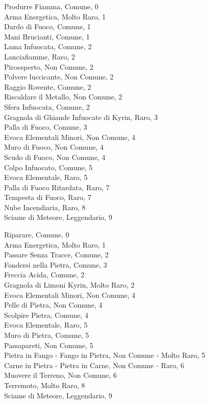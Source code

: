 \begin{multicols}{3}
Produrre Fiamma, Comune, 0\\
Arma Energetica, Molto Raro, 1\\
Dardo di Fuoco, Comune, 1\\
Mani Brucianti, Comune, 1\\
Lama Infuocata, Comune, 2\\
Lanciafiamme, Raro, 2\\
Piroesperto, Non Comune, 2\\
Polvere luccicante, Non Comune, 2\\
Raggio Rovente, Comune, 2\\
Riscaldare il Metallo, Non Comune, 2\\
Sfera Infuocata, Comune, 2\\
Gragnola di Ghiande Infuocate di Kyrin, Raro, 3\\
Palla di Fuoco, Comune, 3\\
Evoca Elementali Minori, Non Comune, 4\\
Muro di Fuoco, Non Comune, 4\\
Scudo di Fuoco, Non Comune, 4\\
Colpo Infuocato, Comune, 5\\
Evoca Elementale, Raro, 5\\
Palla di Fuoco Ritardata, Raro, 7\\
Tempesta di Fuoco, Raro, 7\\
Nube Incendiaria, Raro, 8\\
Sciame di Meteore, Leggendario, 9\\



Riparare, Comune, 0\\
Arma Energetica, Molto Raro, 1\\
Passare Senza Tracce, Comune, 2\\
Fondersi nella Pietra, Comune, 3\\
Freccia Acida, Comune, 2\\
Gragnola di Limoni Kyrin, Molto Raro, 2\\
Evoca Elementali Minori, Non Comune, 4\\
Pelle di Pietra, Non Comune, 4\\
Scolpire Pietra, Comune, 4\\
Evoca Elementale, Raro, 5\\
Muro di Pietra, Comune, 5\\
Passapareti, Non Comune, 5\\
Pietra in Fango - Fango in Pietra, Non Comune - Molto Raro, 5\\
Carne in Pietra - Pietra in Carne, Non Comune - Raro, 6\\
Muovere il Terreno, Non Comune, 6\\
Terremoto, Molto Raro, 8\\
Sciame di Meteore, Leggendario, 9\\



\end{multicols}
